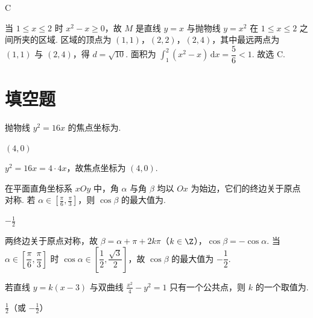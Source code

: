 \begin{answer}
C
\end{answer}

\begin{solution}
当 \(1\leqslant x\leqslant2\) 时 \(x^2-x\geqslant0\)，故 \(M\) 是直线 \(y=x\) 与抛物线 \(y=x^2\) 在 \(1\leqslant x\leqslant2\) 之间所夹的区域. 区域的顶点为 \((1,1)\)，\((2,2)\)，\((2,4)\)，其中最远两点为 \((1,1)\) 与 \((2,4)\)，得 \(d=\sqrt{10}\). 面积为 \(\int_1^2(x^2-x)\,\mathrm{d}x=\dfrac56<1\). 故选 C.
\end{solution}

\section{填空题}

\begin{problem}
抛物线 \(y^2=16x\) 的焦点坐标为\fillinblank{}.
\end{problem}

\begin{answer}
\((4,0)\)
\end{answer}

\begin{solution}
\(y^2=16x=4\cdot4x\)，故焦点坐标为 \((4,0)\).
\end{solution}

\begin{problem}
在平面直角坐标系 \(xOy\) 中，角 \(\alpha\) 与角 \(\beta\) 均以 \(Ox\) 为始边，它们的终边关于原点对称. 若 \(\alpha\in \left[ \frac{\pi}{6},\frac{\pi}{3} \right]\)，则 \(\cos \beta\) 的最大值为\fillinblank{}.
\end{problem}

\begin{answer}
\(-\frac12\)
\end{answer}

\begin{solution}
两终边关于原点对称，故 \(\beta=\alpha+\pi+2k\pi\)（\(k\in\Z\)），\(\cos\beta=-\cos\alpha\). 当 \(\alpha\in\left[\dfrac{\pi}{6},\dfrac{\pi}{3}\right]\) 时 \(\cos\alpha\in\left[\dfrac12,\dfrac{\sqrt3}{2}\right]\)，故 \(\cos\beta\) 的最大值为 \(-\dfrac12\).
\end{solution}

\begin{problem}
若直线 \(y=k(x-3)\) 与双曲线 \(\frac{x^2}{4}-y^2=1\) 只有一个公共点，则 \(k\) 的一个取值为\fillinblank{}.
\end{problem}

\begin{answer}
\(\frac12\)（或 \(-\frac12\)）
\end{answer}

